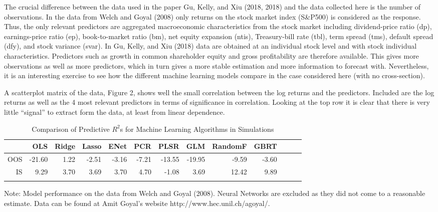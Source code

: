 \documentclass[11pt]{article}
\begin{document}
The crucial difference between the data used in the paper Gu, Kelly, and
Xiu (2018, 2018) and the data collected here is the number of
observations. In the data from Welch and Goyal (2008) only returns on
the stock market index (S\&P500) is considered as the response. Thus,
the only relevant predictors are aggregated macroeconomic
characteristics from the stock market including dividend-price ratio
(dp), earnings-price ratio (ep), book-to-market ratio (bm), net equity
expansion (ntis), Treasury-bill rate (tbl), term spread (tms), default
spread (dfy), and stock variance (svar). In Gu, Kelly, and Xiu (2018)
data are obtained at an individual stock level and with stock individual
characteristics. Predictors such as growth in common shareholder equity and gross
profitability are therefore available. This gives more
observations as well as more predictors, which in turn gives a more
stable estimation and more information to forecast with. Nevertheless, it is an interesting exercise to see how the different machine learning
models compare in the case considered here (with no cross-section).

A scatterplot matrix of the data, Figure 2, shows well the small
correlation between the log returns and the predictors. Included are the log returns as well as the 4 most relevant predictors in
terms of significance in correlation. Looking at the top row it is clear
that there is very little ``signal'' to extract form the data, at least
from linear dependence.

\begin{table}[ht]
\begin{threeparttable}
\centering
\setlength{\tabcolsep}{6pt}
\caption{Comparison of Predictive $R^2$s for Machine Learning Algorithms in Simulations}
\begin{tabular}{rrrrrrrrrrrrr}
  \Xhline{2\arrayrulewidth}
 & OLS & Ridge & Lasso & ENet & PCR & PLSR & GLM & RandomF & GBRT\\ 
  \hline
OOS & -21.60 & 1.22 & -2.51 & -3.16 & -7.21 & -13.55 & -19.95 & -9.59 & -3.60 \\
IS & 9.29 & 3.70 & 3.69 & 3.70 & 4.70 & -1.08 & 3.69 & 12.42 & 9.89  \\ 
   \Xhline{2\arrayrulewidth}
\end{tabular}
\begin{tablenotes}
      \small
      \item Note: Model performance on the data from Welch and Goyal (2008). Neural Networks are excluded as they did not come to a reasonable estimate. Data can be found at Amit Goyal's website http://www.hec.unil.ch/agoyal/.
    \end{tablenotes}
  \end{threeparttable}
\label{table:data}
\end{table}
\end{document}
